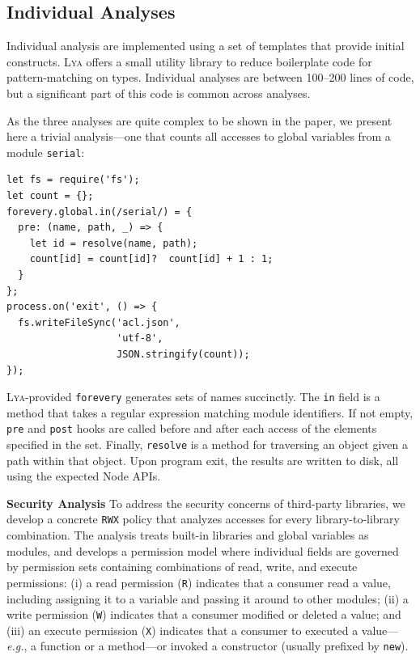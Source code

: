 \documentclass[letterpaper,twocolumn,10pt]{article}
\def\eg{{\em e.g.}, }
\newcommand{\heading}[1]{\vspace{2pt}\noindent\textbf{#1}\enspace}
\newcommand{\ttt}[1]{\texttt{#1}}
\newcommand{\sx}[1]{(\S\ref{#1})}
\newcommand{\sys}{{\scshape Lya}\xspace}
\newcommand{\R}{\ttt{R}\xspace}
\newcommand{\W}{\ttt{W}\xspace}
\newcommand{\X}{\ttt{X}\xspace}
\begin{document}
\subsection{Individual Analyses}
\label{impl2}

Individual analysis are implemented using a set of templates that provide initial constructs.
\sys offers a small utility library to reduce boilerplate code for pattern-matching on types.
Individual analyses are between 100--200 lines of code, but a significant part of this code is common across analyses.

As the three analyses are quite complex to be shown in the paper, we present here a trivial analysis---one that counts all accesses to global variables from a module \ttt{serial}:

\begin{verbatim}
let fs = require('fs');
let count = {};
forevery.global.in(/serial/) = {
  pre: (name, path, _) => {
    let id = resolve(name, path);
    count[id] = count[id]?  count[id] + 1 : 1;
  }
};
process.on('exit', () => {
  fs.writeFileSync('acl.json',
                   'utf-8',
                   JSON.stringify(count));
});
\end{verbatim}

\noindent
\sys-provided \ttt{forevery} generates sets of names succinctly.
The \ttt{in} field is a method that takes a regular expression matching module identifiers.
If not empty, \ttt{pre} and \ttt{post} hooks are called before and after each access of the elements specified in the set.
Finally, \ttt{resolve} is a method for traversing an object given a path within that object.
Upon program exit, the results are written to disk, all using the expected Node APIs.

\heading{Security Analysis}
To address the security concerns of third-party libraries, we develop a concrete \ttt{RWX} policy that analyzes accesses for every library-to-library combination.
The analysis treats built-in libraries and global variables as modules,
and develops a permission model where individual fields are governed by permission sets containing combinations of read, write, and execute permissions:
 (i) a read permission (\R) indicates that a consumer read a value, including assigning it to a variable and passing it around to other modules;
 (ii) a write permission (\W) indicates that a consumer modified or deleted a value; and
 (iii)  an execute permission (\X) indicates that a consumer to executed a value---\eg a function or a method---or invoked a constructor (usually prefixed by \ttt{new}).
\end{document}

